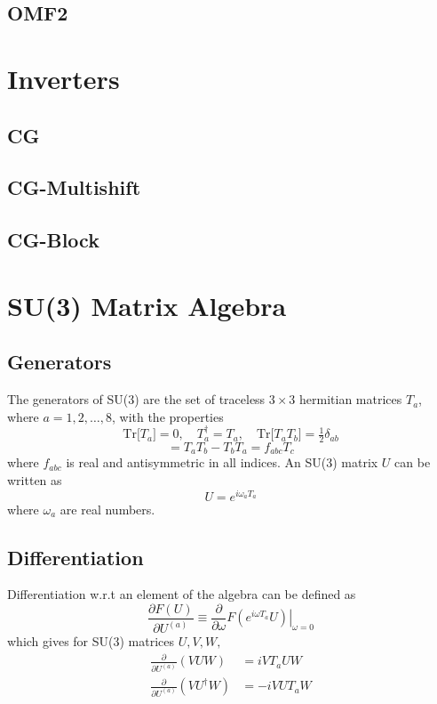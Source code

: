 \documentclass[a4paper,12pt]{article}
\newcommand{\tr}[1]{\text{Tr}\big[#1\big]}
\begin{document}
\subsection{OMF2}

\section{Inverters}
\subsection{CG}
\subsection{CG-Multishift}
\subsection{CG-Block}

\appendix
\section{SU(3) Matrix Algebra}

\subsection{Generators}
The generators of SU(3) are the set of traceless $3\times 3$ hermitian matrices $T_a$, where $a=1,2,\ldots,8$, with the properties
\begin{equation}
\tr{T_a}=0, \quad T_a^{\dagger}=T_a, \quad \tr{T_a T_b} = \tfrac{1}{2}\delta_{ab}
\end{equation}
\begin{equation}
[T_a,T_b] = T_a T_b - T_b T_a = f_{abc} T_c
\end{equation}
where $f_{abc}$ is real and antisymmetric in all indices. An SU(3) matrix $U$ can be written as
\begin{equation}
U = e^{i \omega_a T_a}
\end{equation}
where $\omega_a$ are real numbers.

\subsection{Differentiation}
Differentiation w.r.t an element of the algebra can be defined as
\begin{equation}
\frac{\partial F(U)}{\partial U^{(a)}} \equiv \frac{\partial}{\partial \omega} \left. F(e^{i \omega T_a} U) \right|_{\omega=0}
\end{equation}
which gives for SU(3) matrices $U, V, W,$
\begin{align}
\frac{\partial}{\partial U^{(a)}} \left( V U W \right) &= i V T_a U W \\
\frac{\partial}{\partial U^{(a)}} \left( V U^{\dagger} W \right) &= -i V U T_a W
\end{align}
\end{document}
